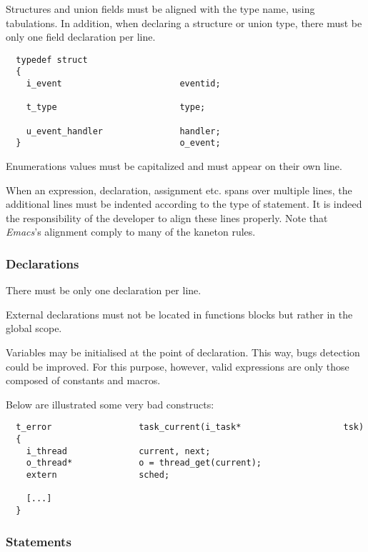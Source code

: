 Structures and union fields must be aligned with the type name, using
tabulations. In addition, when declaring a structure or union type, there
must be only one field declaration per line.

\begin{verbatim}
  typedef struct
  {
    i_event                       eventid;

    t_type                        type;

    u_event_handler               handler;
  }                               o_event;
\end{verbatim}

Enumerations values must be capitalized and must appear on their own line.

When an expression, declaration, assignment etc. spans over multiple lines,
the additional lines must be indented according to the type of statement.
It is indeed the responsibility of the developer to align these lines
properly. Note that \textit{Emacs}'s alignment comply to many of the
kaneton rules.


\subsubsection{Declarations}

There must be only one declaration per line.

External declarations must not be located in functions blocks but rather in the
global scope.

Variables may be initialised at the point of declaration. This way, bugs
detection could be improved. For this purpose, however, valid expressions
are only those composed of constants and macros.

Below are illustrated some very bad constructs:

\begin{verbatim}
  t_error                 task_current(i_task*                    tsk)
  {
    i_thread              current, next;
    o_thread*             o = thread_get(current);
    extern                sched;

    [...]
  }
\end{verbatim}


\subsubsection{Statements}

